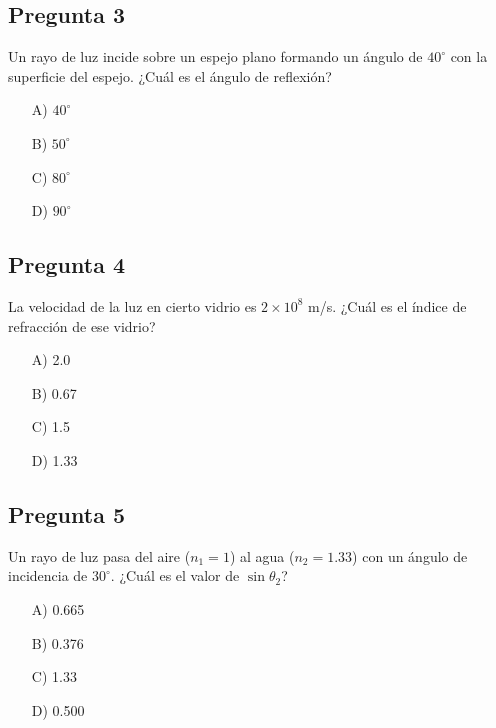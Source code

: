 \begin{preguntabox}
\subsection*{Pregunta 3}
Un rayo de luz incide sobre un espejo plano formando un ángulo de $40^\circ$ con la superficie del espejo. ¿Cuál es el ángulo de reflexión?

\begin{enumerate}
    \item[A)] $40^\circ$
    \item[B)] $50^\circ$
    \item[C)] $80^\circ$
    \item[D)] $90^\circ$
\end{enumerate}
\end{preguntabox}
\newpage
\begin{preguntabox}
\subsection*{Pregunta 4}
La velocidad de la luz en cierto vidrio es $2 \times 10^8$ m/s. ¿Cuál es el índice de refracción de ese vidrio?

\begin{enumerate}
    \item[A)] 2.0
    \item[B)] 0.67
    \item[C)] 1.5
    \item[D)] 1.33
\end{enumerate}
\end{preguntabox}

\begin{preguntabox}
\subsection*{Pregunta 5}
Un rayo de luz pasa del aire ($n_1 = 1$) al agua ($n_2 = 1.33$) con un ángulo de incidencia de $30^\circ$. ¿Cuál es el valor de $\sin\theta_2$?

\begin{enumerate}
    \item[A)] 0.665
    \item[B)] 0.376
    \item[C)] 1.33
    \item[D)] 0.500
\end{enumerate}
\end{preguntabox}

